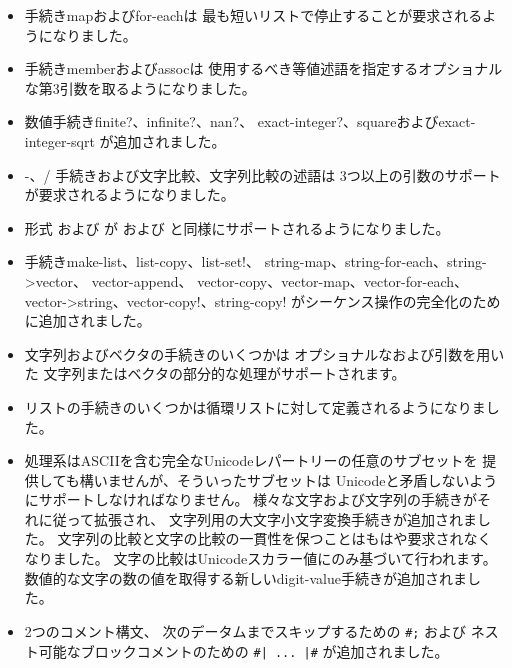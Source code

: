 \begin{itemize}
\item 手続き{\cf map}および{\cf for-each}は
最も短いリストで停止することが要求されるようになりました。

\item 手続き{\cf member}および{\cf assoc}は
使用するべき等値述語を指定するオプショナルな第3引数を取るようになりました。

\item 数値手続き{\cf finite?}、{\cf infinite?}、{\cf nan?}、
{\cf exact-\+integer?}、{\cf square}および{\cf exact-\+integer-\+sqrt}
が追加されました。

\item {\cf -}、{\cf /} 手続きおよび文字比較、文字列比較の述語は
3つ以上の引数のサポートが要求されるようになりました。

\item 形式 \sharptrue{}および \sharpfalse{}が %
\schtrue{}および \schfalse{}と同様にサポートされるようになりました。

\item 手続き{\cf make-\+list}、{\cf list-\+copy}、{\cf list-\+set!}、
{\cf string-\+map}、{\cf string-\+for-\+each}、{\cf string->\+vector}、
{\cf vector-\+append}、
{\cf vector-\+copy}、{\cf vector-\+map}、{\cf vector-\+for-\+each}、
{\cf vector->\+string}、{\cf vector-\+copy!}、{\cf string-\+copy!}
がシーケンス操作の完全化のために追加されました。

\item 文字列およびベクタの手続きのいくつかは
オプショナルなおよび引数を用いた
文字列またはベクタの部分的な処理がサポートされます。

\item リストの手続きのいくつかは循環リストに対して定義されるようになりました。

\item 処理系はASCIIを含む完全なUnicodeレパートリーの任意のサブセットを
提供しても構いませんが、そういったサブセットは
Unicodeと矛盾しないようにサポートしなければなりません。
様々な文字および文字列の手続きがそれに従って拡張され、
文字列用の大文字小文字変換手続きが追加されました。
文字列の比較と文字の比較の一貫性を保つことはもはや要求されなくなりました。
文字の比較はUnicodeスカラー値にのみ基づいて行われます。
数値的な文字の数の値を取得する新しい{\cf digit-value}手続きが追加されました。

\item 2つのコメント構文、
次のデータムまでスキップするための {\tt \#;} および
ネスト可能なブロックコメントのための {\tt \#| ... |\#}
が追加されました。


\end{itemize}
